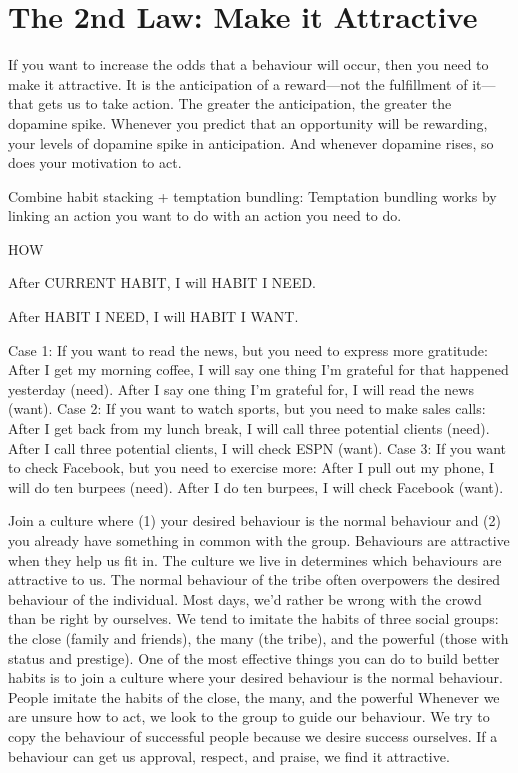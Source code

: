 \documentclass[10pt,twocolumn]{../notes}
\begin{document}
\section{The 2nd Law: Make it Attractive}

\Advice If you want to increase the odds that a behaviour will occur, then you need to make it attractive.
\Fact It is the anticipation of a reward—not the fulfillment of it—that gets us to take action. The greater the anticipation, the greater the dopamine spike.
\Quote Whenever you predict that an opportunity will be rewarding, your levels of dopamine spike in anticipation. And whenever dopamine rises, so does your motivation to act.

\Advice Combine habit stacking + temptation bundling:
\Quote Temptation bundling works by linking an action you want to do with an action you need to do.
\begin{Olist}{HOW}
  \item After CURRENT HABIT, I will HABIT I NEED.
  \item After HABIT I NEED, I will HABIT I WANT.
\end{Olist}
\Example Case 1: If you want to read the news, but you need to express more gratitude: After I get my morning coffee, I will say one thing I’m grateful for that happened yesterday (need). After I say one thing I’m grateful for, I will read the news (want).
\Example Case 2: If you want to watch sports, but you need to make sales calls: After I get back from my lunch break, I will call three potential clients (need). After I call three potential clients, I will check ESPN (want).
\Example Case 3: If you want to check Facebook, but you need to exercise more: After I pull out my phone, I will do ten burpees (need). After I do ten burpees, I will check Facebook (want).

\Advice Join a culture where (1) your desired behaviour is the normal behaviour and (2) you already have something in common with the group.
\Fact Behaviours are attractive when they help us fit in.
\Fact The culture we live in determines which behaviours are attractive to us.
\Fact The normal behaviour of the tribe often overpowers the desired behaviour of the individual. Most days, we’d rather be wrong with the crowd than be right by ourselves.
\Fact We tend to imitate the habits of three social groups: the close (family and friends), the many (the tribe), and the powerful (those with status and prestige).
\Quote One of the most effective things you can do to build better habits is to join a culture where your desired behaviour is the normal behaviour.
\Fact People imitate the habits of the close, the many, and the powerful
\Fact Whenever we are unsure how to act, we look to the group to guide our behaviour.
\Fact We try to copy the behaviour of successful people because we desire success ourselves.
\Fact If a behaviour can get us approval, respect, and praise, we find it attractive.
\end{document}

